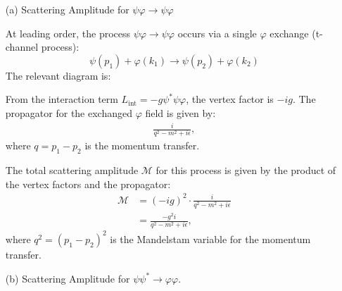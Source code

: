 \begin{enumerate}
    \item [(a)] Scattering Amplitude for $\psi \varphi \rightarrow \psi \varphi$

At leading order, the process $\psi \varphi \rightarrow \psi \varphi$ occurs via a single $\varphi$ exchange (t-channel process):
\[
\psi(p_1) + \varphi(k_1) \rightarrow \psi(p_2) + \varphi(k_2)
\]
The relevant diagram is:
\begin{center}
\end{center}
From the interaction term $L_{\text{int}} = -g \psi^* \psi \varphi$, the vertex factor is $-ig$. The propagator for the exchanged $\varphi$ field is given by:
\begin{align}
    \frac{i}{q^2 - m^2 + i\epsilon}, \label{eq:var-phi-propagator}
\end{align}
where $q = p_1 - p_2$ is the momentum transfer.

The total scattering amplitude $\mathcal{M}$ for this process is given by the product of the vertex factors and the propagator:
\begin{align}
    \mathcal{M} &= (-ig)^2 \cdot \frac{i}{q^2 - m^2 + i\epsilon} \nonumber \\
    &= \frac{-g^2 i}{q^2 - m^2 + i\epsilon}, \label{eq:total-amplitude}
\end{align}
where $q^2 = (p_1 - p_2)^2$ is the Mandelstam variable for the momentum transfer.
\item [(b)] Scattering Amplitude for $\psi \psi^* \rightarrow \varphi \varphi$.


\end{enumerate}
